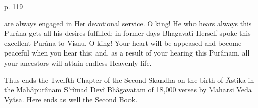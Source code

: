  

p. 119

 

are always engaged in Her devotional service. O king! He who hears always this Purâna gets all his desires fulfilled; in former days Bhagavatî Herself spoke this excellent Purâna to Visnu. O king! Your heart will be appeased and become peaceful when you hear this; and, as a result of your hearing this Purânam, all your ancestors will attain endless Heavenly life.

 

Thus ends the Twelfth Chapter of the Second Skandha on the birth of Âstika in the Mahâpurânam S'rîmad Devî Bhâgavatam of 18,000 verses by Maharsi Veda Vyâsa. Here ends as well the Second Book.

 

